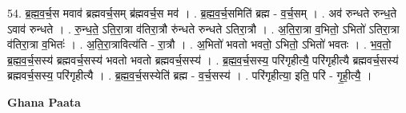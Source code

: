 \documentclass[17pt]{extarticle}
\begin{document}
54. ब्र॒ह्म॒व॒र्च॒स मवाव॑ ब्रह्मवर्च॒सम् ब्र॑ह्मवर्च॒स मव॑ । . ब्र॒ह्म॒व॒र्च॒समिति॑ ब्रह्म - व॒र्च॒सम् । . अव॑ रुन्धते रुन्ध॒ते ऽवाव॑ रुन्धते । . रु॒न्ध॒ते॒ ऽति॒रा॒त्रा व॑तिरा॒त्रौ रु॑न्धते रुन्धते ऽतिरा॒त्रौ । . अ॒ति॒रा॒त्रा व॒भितो॒ ऽभितो॑ ऽतिरा॒त्रा व॑तिरा॒त्रा व॒भितः॑ । . अ॒ति॒रा॒त्रावित्य॑ति - रा॒त्रौ । . अ॒भितो॑ भवतो भवतो॒ ऽभितो॒ ऽभितो॑ भवतः । . भ॒व॒तो॒ ब्र॒ह्म॒व॒र्च॒सस्य॑ ब्रह्मवर्च॒सस्य॑ भवतो भवतो ब्रह्मवर्च॒सस्य॑ । . ब्र॒ह्म॒व॒र्च॒सस्य॒ परि॑गृहीत्यै॒ परि॑गृहीत्यै ब्रह्मवर्च॒सस्य॑ ब्रह्मवर्च॒सस्य॒ परि॑गृहीत्यै । . ब्र॒ह्म॒व॒र्च॒सस्येति॑ ब्रह्म - व॒र्च॒सस्य॑ । . परि॑गृहीत्या॒ इति॒ परि॑ - गृ॒ही॒त्यै॒ । \newline

\textbf{Ghana Paata } \newline
\end{document}
